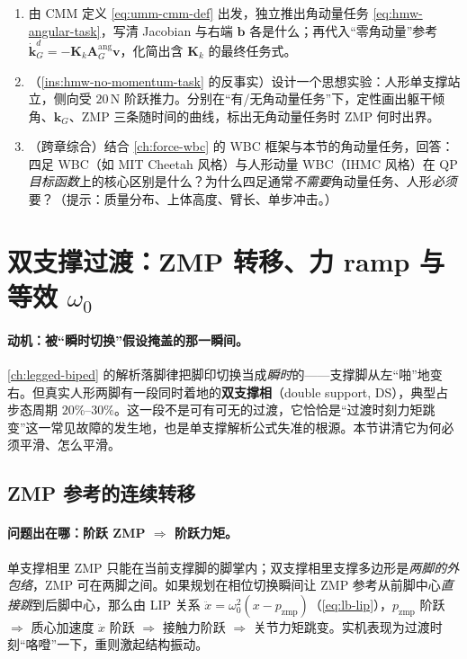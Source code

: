 \begin{practice}
\begin{enumerate}
  \item 由 CMM 定义 \cref{eq:umm-cmm-def} 出发，独立推出角动量任务 \cref{eq:hmw-angular-task}，写清 Jacobian 与右端 $\mathbf b$ 各是什么；再代入“零角动量”参考 $\dot{\mathbf k}_G^d=-\mathbf K_k\mathbf A_G^{\mathrm{ang}}\mathbf v$，化简出含 $\mathbf K_k$ 的最终任务式。
  \item （\cref{ins:hmw-no-momentum-task} 的反事实）设计一个思想实验：人形单支撑站立，侧向受 $20\,\mathrm{N}$ 阶跃推力。分别在“有/无角动量任务”下，定性画出躯干倾角、$\mathbf k_G$、ZMP 三条随时间的曲线，标出无角动量任务时 ZMP 何时出界。
  \item （跨章综合）结合 \cref{ch:force-wbc} 的 WBC 框架与本节的角动量任务，回答：四足 WBC（如 MIT Cheetah 风格）与人形动量 WBC（IHMC 风格）在 QP \emph{目标函数}上的核心区别是什么？为什么四足通常\emph{不需要}角动量任务、人形\emph{必须}要？（提示：质量分布、上体高度、臂长、单步冲击。）
\end{enumerate}
\end{practice}

\section{双支撑过渡：ZMP 转移、力 ramp 与等效 \texorpdfstring{$\omega_0$}{omega0}}
\label{sec:hmw-ds}

\paragraph{动机：被“瞬时切换”假设掩盖的那一瞬间。}
\cref{ch:legged-biped} 的解析落脚律把脚印切换当成\emph{瞬时}的——支撑脚从左“啪”地变右。但真实人形两脚有一段同时着地的\textbf{双支撑相}（double support, DS），典型占步态周期 $20\%$–$30\%$。这一段不是可有可无的过渡，它恰恰是“过渡时刻力矩跳变”这一常见故障的发生地，也是单支撑解析公式失准的根源。本节讲清它为何必须平滑、怎么平滑。

\subsection{ZMP 参考的连续转移}
\label{subsec:hmw-ds-zmp}

\paragraph{问题出在哪：阶跃 ZMP $\Rightarrow$ 阶跃力矩。}
单支撑相里 ZMP 只能在当前支撑脚的脚掌内；双支撑相里支撑多边形是\emph{两脚的外包络}，ZMP 可在两脚之间。如果规划在相位切换瞬间让 ZMP 参考从前脚中心\emph{直接跳}到后脚中心，那么由 LIP 关系 $\ddot x=\omega_0^2(x-p_{\mathrm{zmp}})$（\cref{eq:lb-lip}），$p_{\mathrm{zmp}}$ 阶跃 $\Rightarrow$ 质心加速度 $\ddot x$ 阶跃 $\Rightarrow$ 接触力阶跃 $\Rightarrow$ 关节力矩跳变。实机表现为过渡时刻“咯噔”一下，重则激起结构振动。

